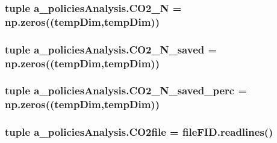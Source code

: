 \hypertarget{namespacea__policies_analysis_aceb06ab3846c8a7f1c3fdd325f80161d}{
\subsubsection[{C\-O2\-\_\-\-N}]{\setlength{\rightskip}{0pt plus 5cm}tuple a\-\_\-policies\-Analysis.\-C\-O2\-\_\-\-N = np.\-zeros(({\bf temp\-Dim},{\bf temp\-Dim}))}}\label{namespacea__policies_analysis_aceb06ab3846c8a7f1c3fdd325f80161d}
\hypertarget{namespacea__policies_analysis_aa42151174c849ccffaed0b97250e7c14}{
\subsubsection[{C\-O2\-\_\-\-N\-\_\-saved}]{\setlength{\rightskip}{0pt plus 5cm}tuple a\-\_\-policies\-Analysis.\-C\-O2\-\_\-\-N\-\_\-saved = np.\-zeros(({\bf temp\-Dim},{\bf temp\-Dim}))}}\label{namespacea__policies_analysis_aa42151174c849ccffaed0b97250e7c14}
\hypertarget{namespacea__policies_analysis_a9386540308e7fe2b8cef990235526da8}{
\subsubsection[{C\-O2\-\_\-\-N\-\_\-saved\-\_\-perc}]{\setlength{\rightskip}{0pt plus 5cm}tuple a\-\_\-policies\-Analysis.\-C\-O2\-\_\-\-N\-\_\-saved\-\_\-perc = np.\-zeros(({\bf temp\-Dim},{\bf temp\-Dim}))}}\label{namespacea__policies_analysis_a9386540308e7fe2b8cef990235526da8}
\hypertarget{namespacea__policies_analysis_ab97620097697e1a2c443ca9246630937}{
\subsubsection[{C\-O2file}]{\setlength{\rightskip}{0pt plus 5cm}tuple a\-\_\-policies\-Analysis.\-C\-O2file = file\-F\-I\-D.\-readlines()}}\label{namespacea__policies_analysis_ab97620097697e1a2c443ca9246630937}
